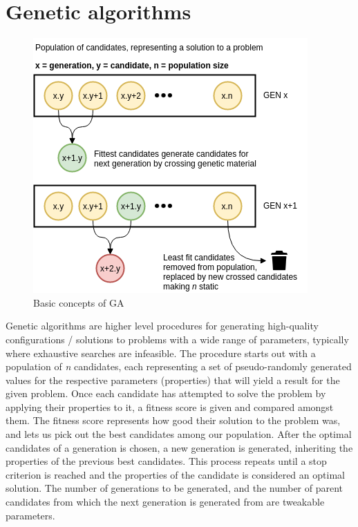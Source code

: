 \documentclass[a4paper,english]{report}
\begin{document}
		\section{Genetic algorithms}
			\begin{figure}[ht]
				\includegraphics[width=\textwidth]{GA}
				\caption{Basic concepts of GA}
			\end{figure}
			Genetic algorithms are higher level procedures for generating high-quality configurations / solutions to problems with a wide range of parameters, typically where exhaustive searches are infeasible. The procedure starts out with a population of \textit{n} candidates, each representing a set of pseudo-randomly generated values for the respective parameters (properties) that will yield a result for the given problem. Once each candidate has attempted to solve the problem by applying their properties to it, a fitness score is given and compared amongst them. The fitness score represents how good their solution to the problem was, and lets us pick out the best candidates among our population. After the optimal candidates of a generation is chosen, a new generation is generated, inheriting the properties of the previous best candidates. This process repeats until a stop criterion is reached and the properties of the candidate is considered an optimal solution. The number of generations to be generated, and the number of parent candidates from which the next generation is generated from are tweakable parameters.
			
\end{document}
